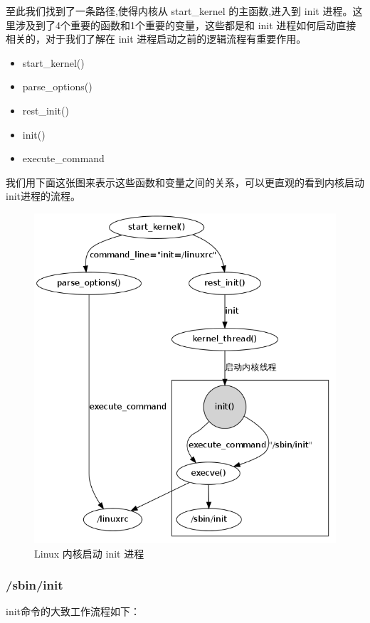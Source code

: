 至此我们找到了一条路径,使得内核从 start\_kernel 的主函数,进入到 init
进程。这里涉及到了4个重要的函数和1个重要的变量，这些都是和 init
进程如何启动直接相关的，对于我们了解在 init
进程启动之前的逻辑流程有重要作用。

\begin{itemize}
\item
  start\_kernel()
\item
  parse\_options()
\item
  rest\_init()
\item
  init()
\item
  execute\_command
\end{itemize}
我们用下面这张图来表示这些函数和变量之间的关系，可以更直观的看到内核启动init进程的流程。

\begin{figure}[htbp]
\centering
\includegraphics{./figures/kernel2init.png}
\caption{Linux 内核启动 init 进程}
\end{figure}

\subsubsection{/sbin/init}

init命令的大致工作流程如下：

